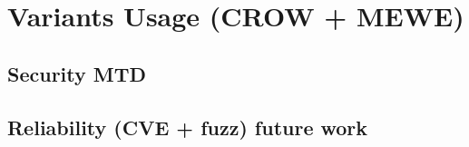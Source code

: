 \chapter{Variants Usage (CROW + MEWE)} 

\section{Security MTD}

\section{Reliability (CVE + fuzz) future work}